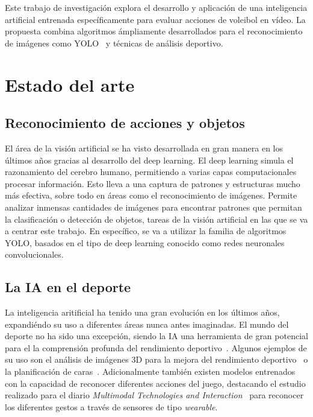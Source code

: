 \documentclass[12pt]{report} %
\begin{document}
    Este trabajo de investigación explora el desarrollo y aplicación de una
    inteligencia artificial entrenada específicamente para evaluar acciones de
    voleibol en vídeo. La propuesta combina algoritmos ámpliamente
    desarrollados para el reconocimiento de imágenes como YOLO~\cite{YOLO} y
    técnicas de análisis deportivo.

 

    \chapter{Estado del arte}
    \label{chap:estadoarte}
    \section{Reconocimiento de acciones y objetos}
    El área de la visión artificial se ha visto desarrollada en gran manera en los últimos años gracias al desarrollo del deep learning. El deep learning simula el razonamiento del cerebro humano, permitiendo a varias capas computacionales procesar información. Esto lleva a una captura de patrones y estructuras mucho más efectiva, sobre todo en áreas como el reconocimiento de imágenes. Permite analizar inmensas cantidades de imágenes para encontrar patrones que permitan la clasificación o detección de objetos, tareas de la visión artificial en las que se va a centrar este trabajo.
    En específico, se va a utilizar la familia de algoritmos YOLO, basados en el tipo de deep learning conocido como redes neuronales convolucionales. 
    \section{La IA en el deporte}
    La inteligencia aritificial ha tenido una gran evolución en los últimos
    años, expandiéndo su uso a diferentes áreas nunca antes imaginadas. El
    mundo del deporte no ha sido una excepción, siendo la IA una herramienta de
    gran potencial para el la comprensión profunda del rendimiento
    deportivo~\cite{ia-sport}. Algunos ejemplos de su uso son el análisis de
    imágenes 3D para la mejora del rendimiento deportivo~\cite{analysis3d} o la
    planificación de caras~\cite{wl}. Adicionalmente también existen modelos
    entrenados con la capacidad de reconocer diferentes acciones del juego,
    destacando el estudio realizado para el diario \textit{Multimodal
    Technologies and Interaction}~\cite{wearable} para reconocer los diferentes
    gestos a través de sensores de tipo \textit{wearable}.
\end{document}
